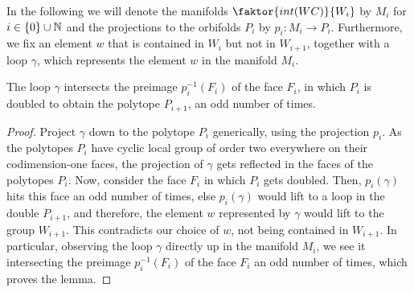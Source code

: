 In the following we will denote the manifolds \(\faktor{int(WC)}{W_i}\) by \(M_i\) for \(i \in \{0\} \cup \mathbb{N}\) and the projections to the orbifolds \(P_i\) by \(p_i : M_i \to P_i\).
Furthermore, we fix an element \(w\) that is contained in \(W_i\) but not in \(W_{i+1}\), together with a loop \(\gamma\), which represents the element \(w\) in the manifold \(M_i\).

\begin{lemma}\label{lem:loopintersection}
    The loop \(\gamma\) intersects the preimage \(p_i^{-1}(F_i)\) of the face \(F_i\), in which \(P_i\) is doubled to obtain the polytope \(P_{i+1}\), an odd number of times.
\end{lemma}
\begin{proof}
    Project \(\gamma\) down to the polytope \(P_i\) generically, using the projection \(p_i\).
    As the polytopes \(P_i\) have cyclic local group of order two everywhere on their codimension-one faces, the projection of \(\gamma\) gets reflected in the faces of the polytopes \(P_i\).
    Now, consider the face \(F_i\) in which \(P_i\) gets doubled.
    Then, \(p_i(\gamma)\) hits this face an odd number of times, else \(p_i(\gamma)\) would lift to a loop in the double \(P_{i+1}\), and therefore, the element \(w\) represented by \(\gamma\) would lift to the group \(W_{i+1}\).
    This contradicts our choice of \(w\), not being contained in \(W_{i+1}\).
    In particular, observing the loop \(\gamma\) directly up in the manifold \(M_i\), we see it intersecting the preimage \(p_i^{-1}(F_i)\) of the face \(F_i\) an odd number of times, which proves the lemma.
\end{proof}


